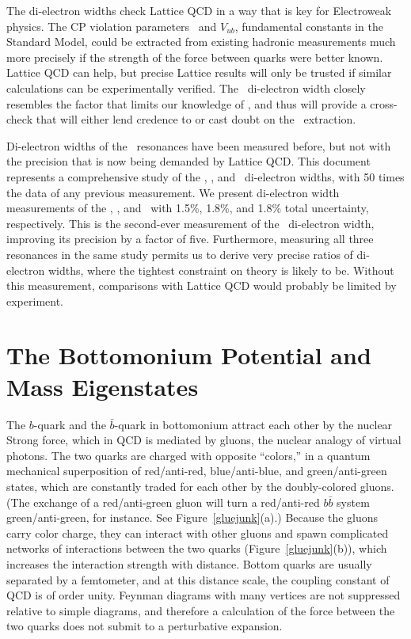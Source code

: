 \documentclass{cornell}
\begin{document}
The di-electron widths check Lattice QCD in a way that is key for
Electroweak physics.  The CP violation parameters \vtd\ and $V_{ub}$,
fundamental constants in the Standard Model, could be extracted from
existing hadronic measurements much more precisely if the strength of
the force between quarks were better known.  Lattice QCD can help, but
precise Lattice results will only be trusted if similar calculations
can be experimentally verified.  The \ups\ di-electron width closely
resembles the factor that limits our knowledge of \vtd, and thus will
provide a cross-check that will either lend credence to or cast doubt
on the \vtd\ extraction.

Di-electron widths of the \ups\ resonances have been measured before,
but not with the precision that is now being demanded by Lattice QCD.
This document represents a comprehensive study of the \us, \uss, and
\usss\ di-electron widths, with 50 times the data of any previous
measurement.  We present di-electron width measurements of the \us,
\uss, and \usss\ with 1.5\%, 1.8\%, and 1.8\% total uncertainty,
respectively.  This is the second-ever measurement of the \usss\
di-electron width, improving its precision by a factor of five.
Furthermore, measuring all three resonances in the same study permits
us to derive very precise ratios of di-electron widths, where the
tightest constraint on theory is likely to be.  Without this
measurement, comparisons with Lattice QCD would probably be limited by
experiment.

\section{The Bottomonium Potential and Mass Eigenstates}

The $b$-quark and the $\bar{b}$-quark in bottomonium attract each
other by the nuclear Strong force, which in QCD is mediated by gluons,
the nuclear analogy of virtual photons.  The two quarks are charged
with opposite ``colors,'' in a quantum mechanical superposition of
red/anti-red, blue/anti-blue, and green/anti-green states, which are
constantly traded for each other by the doubly-colored gluons.  (The
exchange of a red/anti-green gluon will turn a red/anti-red $b\bar{b}$
system green/anti-green, for instance.  See Figure~\ref{gluejunk}(a).)
Because the gluons carry color charge, they can interact with other
gluons and spawn complicated networks of interactions between the two
quarks (Figure~\ref{gluejunk}(b)), which increases the interaction
strength with distance.  Bottom quarks are usually separated by a
femtometer, and at this distance scale, the coupling constant of QCD
is of order unity.  Feynman diagrams with many vertices are not
suppressed relative to simple diagrams, and therefore a calculation of
the force between the two quarks does not submit to a perturbative
expansion.
\end{document}
